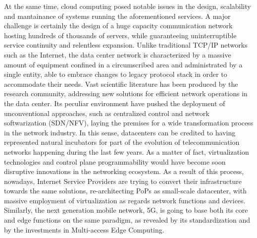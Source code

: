 At the same time, cloud computing posed notable issues in the design, scalability and mantainance of systems running the aforementioned services. A major challenge is certainly the design of a huge capacity communication network hosting hundreds of thousands of servers, while guaranteeing
uninterruptible service continuity and relentless expansion. Unlike traditional TCP/IP networks such as the Internet, the data center network is characterized by a massive amount of equipment confined in a circumscribed area and administrated by a single entity, able to embrace changes to legacy protocol stack in order to accommodate their needs. 
Vast scientific literature has been produced by the research community, addressing new solutions for efficient network operations in the data center. Its peculiar environment have pushed the deployment %
of unconventional approaches, such as centralized control and network softwarization (SDN/NFV), laying the premises for a wide transformation process in the network industry. In this sense, datacenters can be credited to having represented natural incubators for part of the evolution of telecommunication networks happening during the last few years. As a matter of fact, virtualization technologies and control plane programmability would have become soon disruptive innovations in the networking ecosystem.
As a result of this process, nowadays, Internet Service Providers are trying to convert their infrastructure towards the same solutions, re-architecting PoPs as small-scale datacenter, with massive employment of virtualization as regards network functions and devices. Similarly, the next generation mobile network, 5G, is going to base both its core and edge functions on the same paradigm, as revealed by its standardization and by the investments in Multi-access Edge Computing. 

